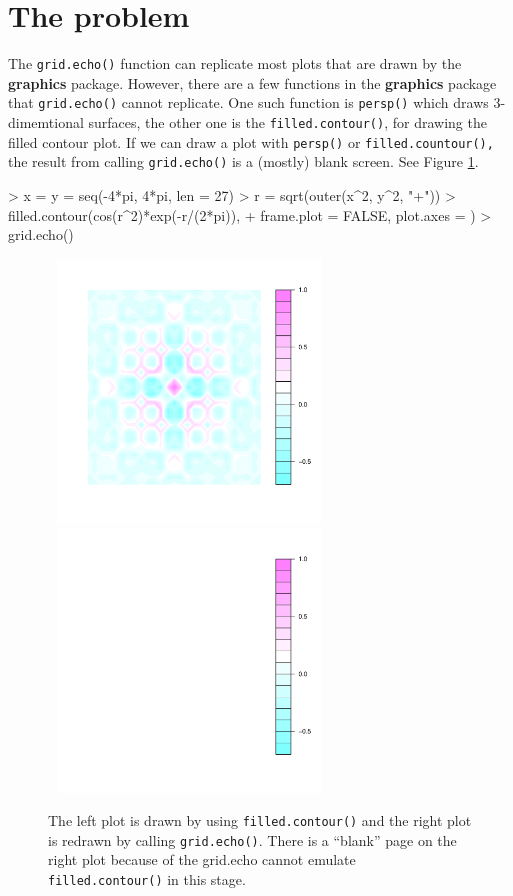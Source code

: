 \documentclass[11pt,twoside]{report}
\begin{document}
\section{The problem}
The \texttt{grid.echo()} function can replicate most plots that are drawn by the \textbf{graphics} package. However, there are a few functions in the \textbf{graphics} package that \texttt{grid.echo()} cannot replicate. One such function is \texttt{persp()} which draws 3-dimemtional surfaces, the other one is the \texttt{filled.contour()}, for drawing the filled contour plot. If we can draw a plot with \texttt{persp()} or \texttt{filled.countour(),} the result from calling \texttt{grid.echo()} is a (mostly) blank screen. See Figure \ref{figure_1.3}.
\begin{Schunk}
\begin{Sinput}
> x = y = seq(-4*pi, 4*pi, len = 27)
> r = sqrt(outer(x^2, y^2, "+"))
> filled.contour(cos(r^2)*exp(-r/(2*pi)), 
+                frame.plot = FALSE, plot.axes = {})
> grid.echo()
\end{Sinput}
\end{Schunk}
\begin{figure}[h]
	\begin{center}
		\includegraphics[height = 7cm, width = 7.5cm]{figure/report_fill_1}
		\includegraphics[height = 7cm, width = 7.5cm]{figure/report_fill_2}
		\caption{The left plot is drawn by using \texttt{filled.contour()} and the right plot is redrawn by calling \texttt{grid.echo()}. There is a ``blank'' page on the right plot because of the grid.echo cannot emulate \texttt{filled.contour()} in this stage.}
		\label{figure_1.3}
	\end{center}
\end{figure}
\end{document}
